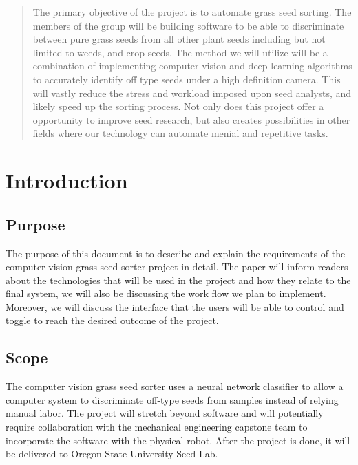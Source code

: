 \documentclass[onecolumn, draftclsnofoot,10pt, compsoc]{IEEEtran}
\begin{document}
\begin{titlepage}
\begin{singlespace}
\begin{abstract}
        	The primary objective of the project is to automate grass seed sorting. The members of the group will be building software to be able to discriminate between pure grass seeds from all other plant seeds including but not limited to weeds, and crop seeds. The method we will utilize will be a combination of implementing computer vision and deep learning algorithms to accurately identify off type seeds under a high definition camera. This will vastly reduce the stress and workload imposed upon seed analysts, and likely speed up the sorting process. Not only does this project offer a opportunity to improve seed research, but also creates possibilities in other fields where our technology can automate menial and repetitive tasks.
        \end{abstract}     
    \end{singlespace}
\end{titlepage}
\newpage
{}
\tableofcontents
\clearpage

\section{Introduction}

\subsection{Purpose}
The purpose of this document is to describe and explain the requirements of the computer vision grass seed sorter project in detail. The paper will inform readers about the technologies that will be used in the project and how they relate to the final system, we will also be discussing the work flow we plan to implement. Moreover, we will discuss the interface that the users will be able to control and toggle to reach the desired outcome of the project.   

\subsection{Scope}
The computer vision grass seed sorter uses a neural network classifier to allow a computer system to discriminate off-type seeds from samples instead of relying manual labor. The project will stretch beyond software and will potentially require collaboration with the mechanical engineering capstone team to incorporate the software with the physical robot. After the project is done, it will be delivered to Oregon State University Seed Lab. 
\end{document}
